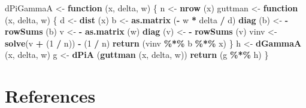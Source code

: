\documentclass[
  12pt,
]{article}
\newenvironment{Shaded}{\begin{snugshade}}{\end{snugshade}}
\newcommand{\ControlFlowTok}[1]{\textcolor[rgb]{0.13,0.29,0.53}{\textbf{#1}}}
\newcommand{\DecValTok}[1]{\textcolor[rgb]{0.00,0.00,0.81}{#1}}
\newcommand{\FunctionTok}[1]{\textcolor[rgb]{0.13,0.29,0.53}{\textbf{#1}}}
\newcommand{\NormalTok}[1]{#1}
\newcommand{\OtherTok}[1]{\textcolor[rgb]{0.56,0.35,0.01}{#1}}
\newcommand{\SpecialCharTok}[1]{\textcolor[rgb]{0.81,0.36,0.00}{\textbf{#1}}}
\begin{document}
\begin{Shaded}
\begin{Highlighting}[]
\NormalTok{dPiGammaA }\OtherTok{\textless{}{-}} \ControlFlowTok{function}\NormalTok{ (x, delta, w) \{}
\NormalTok{  n }\OtherTok{\textless{}{-}} \FunctionTok{nrow}\NormalTok{ (x)}
\NormalTok{  guttman }\OtherTok{\textless{}{-}} \ControlFlowTok{function}\NormalTok{ (x, delta, w) \{}
\NormalTok{    d }\OtherTok{\textless{}{-}} \FunctionTok{dist}\NormalTok{ (x)}
\NormalTok{    b }\OtherTok{\textless{}{-}} \FunctionTok{as.matrix}\NormalTok{ (}\SpecialCharTok{{-}}\NormalTok{ w }\SpecialCharTok{*}\NormalTok{ delta }\SpecialCharTok{/}\NormalTok{ d)}
    \FunctionTok{diag}\NormalTok{ (b) }\OtherTok{\textless{}{-}} \SpecialCharTok{{-}} \FunctionTok{rowSums}\NormalTok{ (b)}
\NormalTok{    v }\OtherTok{\textless{}{-}} \SpecialCharTok{{-}} \FunctionTok{as.matrix}\NormalTok{ (w)}
    \FunctionTok{diag}\NormalTok{ (v) }\OtherTok{\textless{}{-}} \SpecialCharTok{{-}} \FunctionTok{rowSums}\NormalTok{ (v)}
\NormalTok{    vinv }\OtherTok{\textless{}{-}} \FunctionTok{solve}\NormalTok{(v }\SpecialCharTok{+}\NormalTok{ (}\DecValTok{1} \SpecialCharTok{/}\NormalTok{ n)) }\SpecialCharTok{{-}}\NormalTok{ (}\DecValTok{1} \SpecialCharTok{/}\NormalTok{ n)}
    \FunctionTok{return}\NormalTok{ (vinv }\SpecialCharTok{\%*\%}\NormalTok{ b }\SpecialCharTok{\%*\%}\NormalTok{ x)}
\NormalTok{  \}}
\NormalTok{  h }\OtherTok{\textless{}{-}} \FunctionTok{dGammaA}\NormalTok{ (x, delta, w)}
\NormalTok{  g }\OtherTok{\textless{}{-}} \FunctionTok{dPiA}\NormalTok{ (}\FunctionTok{guttman}\NormalTok{ (x, delta, w))}
  \FunctionTok{return}\NormalTok{ (g }\SpecialCharTok{\%*\%}\NormalTok{ h)}
\NormalTok{\}}
\end{Highlighting}
\end{Shaded}

\section*{References}\label{references}
\end{document}
